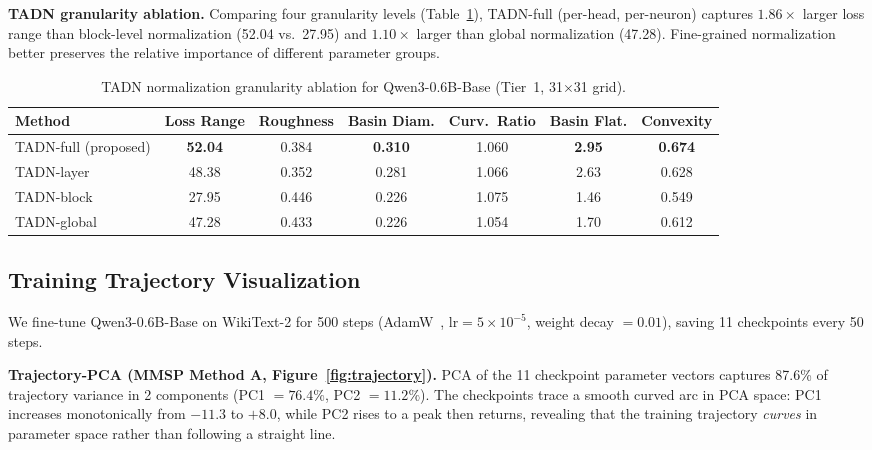 \documentclass{article}
\begin{document}
\textbf{TADN granularity ablation.} Comparing four granularity levels (Table~\ref{tab:tadn_ablation}), TADN-full (per-head, per-neuron) captures $1.86\times$ larger loss range than block-level normalization (52.04 vs.\ 27.95) and $1.10\times$ larger than global normalization (47.28). Fine-grained normalization better preserves the relative importance of different parameter groups.

\begin{table}[t]
\centering
\caption{TADN normalization granularity ablation for Qwen3-0.6B-Base (Tier~1, 31$\times$31 grid).}
\label{tab:tadn_ablation}
\small
\begin{tabular}{lcccccc}
\toprule
\textbf{Method} & \textbf{Loss Range} & \textbf{Roughness} & \textbf{Basin Diam.} & \textbf{Curv.\ Ratio} & \textbf{Basin Flat.} & \textbf{Convexity} \\
\midrule
TADN-full (proposed) & \textbf{52.04} & 0.384 & \textbf{0.310} & 1.060 & \textbf{2.95} & \textbf{0.674} \\
TADN-layer & 48.38 & 0.352 & 0.281 & 1.066 & 2.63 & 0.628 \\
TADN-block & 27.95 & 0.446 & 0.226 & 1.075 & 1.46 & 0.549 \\
TADN-global & 47.28 & 0.433 & 0.226 & 1.054 & 1.70 & 0.612 \\
\bottomrule
\end{tabular}
\end{table}

\subsection{Training Trajectory Visualization}
\label{sec:trajectory}

We fine-tune Qwen3-0.6B-Base on WikiText-2 for 500 steps (AdamW~\citep{loshchilov2019decoupled}, lr$=5 \times 10^{-5}$, weight decay $= 0.01$), saving 11 checkpoints every 50 steps.

\textbf{Trajectory-PCA (MMSP Method A, Figure~\ref{fig:trajectory}).} PCA of the 11 checkpoint parameter vectors captures 87.6\% of trajectory variance in 2 components (PC1 $= 76.4\%$, PC2 $= 11.2\%$). The checkpoints trace a smooth curved arc in PCA space: PC1 increases monotonically from $-11.3$ to $+8.0$, while PC2 rises to a peak then returns, revealing that the training trajectory \emph{curves} in parameter space rather than following a straight line.
\end{document}
